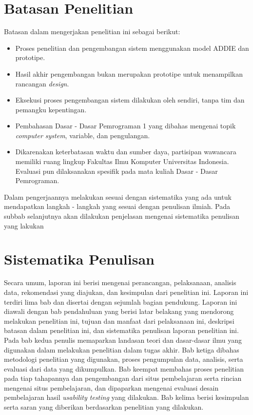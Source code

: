 \section{Batasan Penelitian}
Batasan dalam mengerjakan penelitian ini sebagai berikut:
\begin{itemize}
	\item Proses penelitian dan pengembangan sistem menggunakan model ADDIE dan prototipe.
	\item Hasil akhir pengembangan bukan merupakan prototipe untuk menampilkan rancangan \textit{design}.
	\item Eksekusi proses pengembangan sistem dilakukan oleh \saya sendiri, tanpa tim dan pemangku kepentingan.
	\item Pembahasan Dasar - Dasar Pemrograman 1 yang dibahas mengenai topik \textit{computer system}, variable, dan pengulangan.
	\item Dikarenakan keterbatasan waktu dan sumber daya, partisipan wawancara memiliki ruang lingkup  Fakultas Ilmu Komputer Universitas Indonesia. Evaluasi pun dilaksanakan spesifik pada mata kuliah Dasar - Dasar Pemrograman.
\end{itemize}
Dalam pengerjaannya \saya melakukan sesuai dengan sistematika yang ada untuk mendapatkan langkah - langkah yang sesuai dengan penulisan ilmiah. Pada subbab selanjutnya akan dilakukan penjelasan mengenai sistematika penulisan yang lakukan
\section{Sistematika Penulisan}
Secara umum, laporan ini berisi mengenai perancangan, pelaksanaan, analisis data, rekomendasi yang diajukan, dan kesimpulan dari penelitian ini. Laporan ini terdiri lima bab dan disertai dengan sejumlah bagian pendukung. Laporan ini diawali dengan bab pendahuluan yang berisi latar belakang yang mendorong \saya melakukan penelitian ini, tujuan dan manfaat dari pelaksanaan ini, deskripsi batasan dalam penelitian ini, dan sistematika penulisan laporan penelitian ini. Pada bab kedua penulis memaparkan landasan teori dan dasar-dasar ilmu yang
digunakan dalam melakukan penelitian dalam tugas akhir. Bab ketiga dibahas
metodologi penelitian yang digunakan, proses pengumpulan data, analisis, serta
evaluasi dari data yang dikumpulkan. Bab keempat membahas proses penelitian
pada tiap tahapannya dan pengembangan dari situs pembelajaran serta rincian
mengenai situs pembelajaran, dan dipaparkan mengenai evaluasi desain pembelajaran hasil \textit{usability testing} yang dilakukan. Bab kelima berisi kesimpulan serta saran yang diberikan berdasarkan penelitian yang dilakukan.